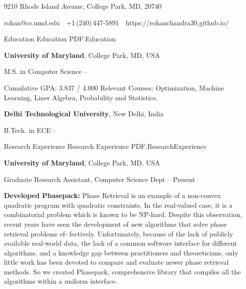 \documentclass[letterpaper,MMMyyyy,nonstopmode]{simpleresumecv}
\newcommand{\CVAuthor}{Rohan Chandra}
\newcommand{\CVWebpage}{https://rohanchandra30.github.io/}
\begin{document}

\Title{\CVAuthor}

\begin{SubTitle}
{9210 Rhode Island Avenue, College Park, MD, 20740}
\par
{rohan@cs.umd.edu}
\,\SubBulletSymbol\,
+1\,(240)\,447-5891
\,\SubBulletSymbol\,
\CVWebpage
\end{SubTitle}

\begin{Body}


\Section
{Education}
{Education}
{PDF:Education}

\Entry
{\textbf{University of Maryland}},
College Park, MD, USA

\Gap
\BulletItem
M.S. in
{Computer Science}
\hfill
{} --
\begin{Detail}
\SubBulletItem
Cumulative GPA: 3.837 / 4.000
\SubBulletItem
Relevant Courses: Optimization, Machine Learning, Liner Algebra, Probability and Statistics.
\end{Detail}

\BigGap
\Entry
{\textbf{Delhi Technological University}},
New Delhi, India

\Gap
\BulletItem
B.Tech. in
{ECE}
\hfill
{} --


\Section
{Research Experience}
{Research Experience}
{PDF:ResearchExperience}

\Entry
{\textbf{{University of Maryland}},
College Park, MD, USA

\Gap
\BulletItem
Graduate Research Assistant, Computer Science Dept
\hfill
{} -- Present
\begin{Detail}
\SubBulletItem
\textbf{Developed Phasepack: }Phase Retrieval is an example of a non-convex quadratic program with
quadratic constraints. In the real-valued case, it is a combinatorial problem which is known to be NP-hard. Despite
this observation, recent years have seen the development of new algorithms that solve phase retrieval problems ef-
fectively. Unfortunately, because of the lack of publicly available real-world data, the lack of a common software
interface for different algorithms, and a knowledge gap between practitioners and theoreticians, only little work has
been devoted to compare and evaluate newer phase retrieval methods. So we created Phasepack, comprehensive library that compiles all the algorithms within a uniform interface.


\end{Detail}}
\end{Body}
\end{document}
